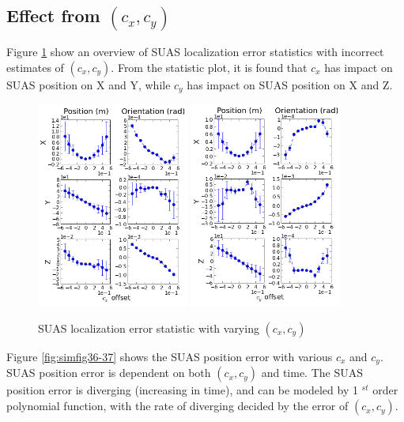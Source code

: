 \subsection{Effect from $(c_{x}, c_{y})$}
Figure \ref{fig:simfig34-35} show an overview of SUAS localization error statistics with incorrect estimates of $ (c_{x}, c_{y})$. From the statistic plot, it is found that $c_x$ has impact on SUAS position on X and Y, while $c_y$ has impact on SUAS position on X and Z. 

\begin{figure}[h]
  \centering
  \includegraphics[width=5cm, keepaspectratio=true]{./Figures/SimulationFigures/Figure34.png}
  \includegraphics[width=5cm, keepaspectratio=true]{./Figures/SimulationFigures/Figure35.png}
  \caption{SUAS localization error statistic with varying $(c_x, c_y)$}
  \label{fig:simfig34-35}
\end{figure}

Figure \ref{fig:simfig36-37} shows the SUAS position error with various $c_x$ and $c_y$. SUAS position error is dependent on both $(c_{x}, c_{y})$ and time. The SUAS position error is diverging (increasing in time), and can be modeled by 1 $^{st}$ order polynomial function, with the rate of diverging decided by the error of $(c_{x}, c_{y})$. 

